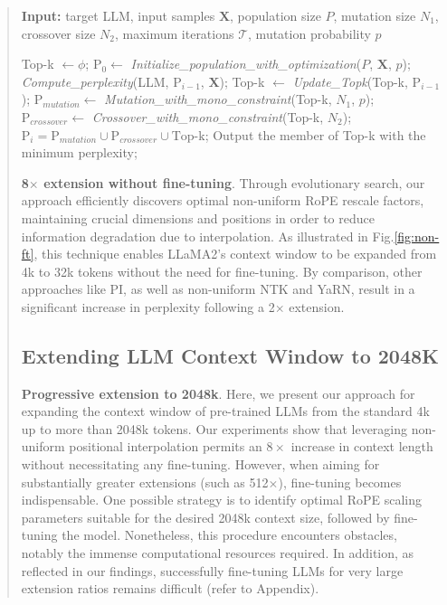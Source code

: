 \begin{abstract}
\begin{algorithm}[t]
	\small
	\caption{The search algorithm}
	\textbf{Input:} target LLM, input samples $\mathbf{X}$, population size $P$, mutation size $N_1$, crossover size $N_2$, maximum iterations $\mathcal{T}$, mutation probability $p$\\

	\begin{algorithmic}[1]
		\label{alg:search}
		\STATE Top-k $\leftarrow \phi$;
		\STATE $\text{P}_0 \leftarrow$ \textit{Initialize\_population\_with\_optimization}($P$, $\mathbf{X}$, $p$);
		\STATE \textit{Compute\_perplexity}(LLM, $\text{P}_{i-1}$, $\mathbf{X}$);
		\STATE Top-k $\leftarrow$ \textit{Update\_Topk}(Top-k, $\text{P}_{i-1}$);
		\STATE $\text{P}_{mutation} \leftarrow$ \textit{Mutation\_with\_mono\_constraint}(Top-k, $N_1$, $p$);
		\STATE $\text{P}_{crossover} \leftarrow$ \textit{Crossover\_with\_mono\_constraint}(Top-k, $N_2$);
		\STATE $\text{P}_i = \text{P}_{mutation} \cup \text{P}_{crossover} \cup \text{Top-k}$;
		\ENDFOR
		\STATE Output the member of Top-k with the minimum perplexity;
	\end{algorithmic}
\end{algorithm}

\textbf{8$\times$ extension without fine-tuning}. Through evolutionary search, our approach efficiently discovers optimal non-uniform RoPE rescale factors, maintaining crucial dimensions and positions in order to reduce information degradation due to interpolation. As illustrated in Fig.\ref{fig:non-ft}, this technique enables LLaMA2's context window to be expanded from 4k to 32k tokens without the need for fine-tuning. By comparison, other approaches like PI, as well as non-uniform NTK and YaRN, result in a significant increase in perplexity following a 2$\times$ extension.

\subsection{Extending LLM Context Window to 2048K}
\label{sec:extendto2048k}

\textbf{Progressive extension to 2048k}. Here, we present our approach for expanding the context window of pre-trained LLMs from the standard 4k up to more than 2048k tokens. Our experiments show that leveraging non-uniform positional interpolation permits an $8\times$ increase in context length without necessitating any fine-tuning. However, when aiming for substantially greater extensions (such as 512$\times$), fine-tuning becomes indispensable. One possible strategy is to identify optimal RoPE scaling parameters suitable for the desired 2048k context size, followed by fine-tuning the model. Nonetheless, this procedure encounters obstacles, notably the immense computational resources required. In addition, as reflected in our findings, successfully fine-tuning LLMs for very large extension ratios remains difficult (refer to Appendix).


\end{abstract}
